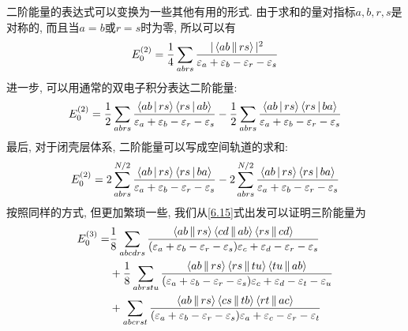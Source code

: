 二阶能量的表达式可以变换为一些其他有用的形式. 
由于求和的量对指标$a,b, r,s$是对称的, 
而且当$a=b$或$r=s$时为零, 
所以可以有
\begin{align}
E_0^{(2)} = \frac{1}{4} \sum_{abrs}\frac{|\Braket{ab||rs}|^2}{\varepsilon_a + \varepsilon_b -\varepsilon_r-\varepsilon_s}
\label{6.72}
\end{align}
进一步, 
可以用通常的双电子积分表达二阶能量:
\begin{align}
E_0^{(2)} = \frac{1}{2}\sum_{abrs}\frac{\Braket{ab|rs}\Braket{rs|ab}}{\varepsilon_a + \varepsilon_b -\varepsilon_r-\varepsilon_s}-\frac{1}{2}\sum_{abrs}\frac{\Braket{ab|rs}\Braket{rs|ba}}{\varepsilon_a + \varepsilon_b -\varepsilon_r-\varepsilon_s}
\label{6.73}
\end{align}
最后, 
对于闭壳层体系, 
二阶能量可以写成空间轨道的求和:
\begin{align}
E_0^{(2)} = 2\sum_{abrs}^{N/2}\frac{\Braket{ab|rs}\Braket{rs|ba}}{\varepsilon_a + \varepsilon_b -\varepsilon_r-\varepsilon_s}-2\sum_{abrs}^{N/2}\frac{\Braket{ab|rs}\Braket{rs|ba}}{\varepsilon_a + \varepsilon_b -\varepsilon_r-\varepsilon_s}
\label{6.74}
\end{align}
按照同样的方式, 
但更加繁琐一些, 
我们从\autoref{6.15}式出发可以证明三阶能量为
\begin{align}
E_0^{(3)} = & \frac{1}{8} \sum_{abcdrs} \frac{\Braket{ab||rs}\Braket{cd||ab}\Braket{rs||cd}}{(\varepsilon_a + \varepsilon_b -\varepsilon_r-\varepsilon_s){\varepsilon_c + \varepsilon_d -\varepsilon_r-\varepsilon_s}} \notag\\
          & + \frac{1}{8}\sum_{abrstu}\frac{\Braket{ab||rs}\Braket{rs||tu}\Braket{tu||ab}}{(\varepsilon_a + \varepsilon_b -\varepsilon_r-\varepsilon_s){\varepsilon_c + \varepsilon_d -\varepsilon_t-\varepsilon_u}} \notag\\
          & + \sum_{abcrst}\frac{\Braket{ab||rs}\Braket{cs||tb}\Braket{rt||ac}}{(\varepsilon_a + \varepsilon_b -\varepsilon_r-\varepsilon_s){\varepsilon_a + \varepsilon_c -\varepsilon_r-\varepsilon_t}}
          \label{6.75}
\end{align}


